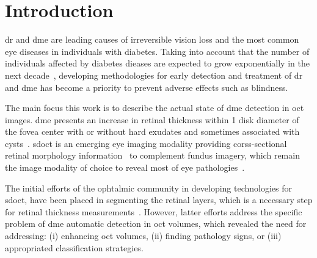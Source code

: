 \graphicspath{ {./content/intro/figures/} }

\section{Introduction}
\label{sec:intro}  %

\gls{dr} and \gls{dme} are leading causes of irreversible vision loss and the most common eye diseases in individuals with diabetes.
Taking into account that the number of individuals affected by diabetes dieases are expected to grow exponentially in the next decade~\cite{},
developing methodologies for early detection and treatment of \gls{dr} and \gls{dme} has become a priority to prevent adverse effects such as blindness.

The main focus this work is to describe the actual state of \gls{dme} detection in \gls{oct} images.
\gls{dme} presents an increase in retinal thickness within 1 disk diameter of the fovea center with or without hard exudates and sometimes associated with cysts~\cite{ETDRSG1985}.
\gls{sdoct} is an emerging eye imaging modality providing corss-sectional retinal morphology information~\cite{Wang2015}
to complement fundus imagery, which remain the image modality of choice to reveal most of eye pathologies~\cite{Mookiah20132136,Trucco2013}.

The initial efforts of the ophtalmic community in developing technologies for \gls{sdoct}, have been placed in segmenting the retinal layers, which is a necessary step for retinal thickness measurements~\cite{Chiu2010,Kafieh2013}.
However, latter efforts address the specific problem of \gls{dme} automatic detection in \gls{oct} volumes, which revealed the need for addressing: (i) enhancing \gls{oct} volumes, (ii) finding pathology signs, or (iii) appropriated classification strategies.

